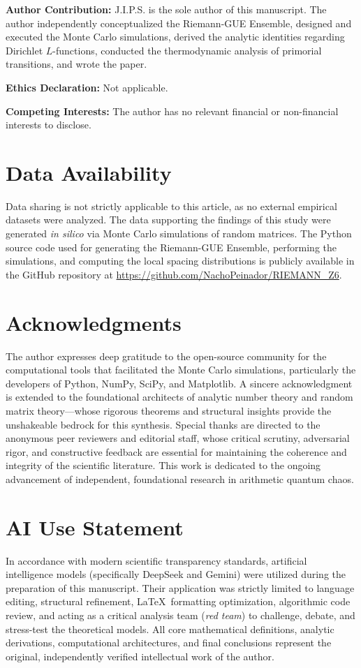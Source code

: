 \documentclass[12pt,a4paper]{article}
\theoremstyle{plain}
\theoremstyle{definition}
\theoremstyle{remark}
\begin{document}
\vspace{0.5em}
\noindent\textbf{Author Contribution:} J.I.P.S. is the sole author of this manuscript. The author independently conceptualized the Riemann-GUE Ensemble, designed and executed the Monte Carlo simulations, derived the analytic identities regarding Dirichlet $L$-functions, conducted the thermodynamic analysis of primorial transitions, and wrote the paper.

\vspace{0.5em}
\noindent\textbf{Ethics Declaration:} Not applicable.

\vspace{0.5em}
\noindent\textbf{Competing Interests:} The author has no relevant financial or non-financial interests to disclose.

\section*{Data Availability}
Data sharing is not strictly applicable to this article, as no external empirical datasets were analyzed. The data supporting the findings of this study were generated \textit{in silico} via Monte Carlo simulations of random matrices. The Python source code used for generating the Riemann-GUE Ensemble, performing the simulations, and computing the local spacing distributions is publicly available in the GitHub repository at \url{https://github.com/NachoPeinador/RIEMANN_Z6}.

\section*{Acknowledgments}
The author expresses deep gratitude to the open-source community for the computational tools that facilitated the Monte Carlo simulations, particularly the developers of Python, NumPy, SciPy, and Matplotlib. A sincere acknowledgment is extended to the foundational architects of analytic number theory and random matrix theory---whose rigorous theorems and structural insights provide the unshakeable bedrock for this synthesis. Special thanks are directed to the anonymous peer reviewers and editorial staff, whose critical scrutiny, adversarial rigor, and constructive feedback are essential for maintaining the coherence and integrity of the scientific literature. This work is dedicated to the ongoing advancement of independent, foundational research in arithmetic quantum chaos.

\section*{AI Use Statement}
In accordance with modern scientific transparency standards, artificial intelligence models (specifically DeepSeek and Gemini) were utilized during the preparation of this manuscript. Their application was strictly limited to language editing, structural refinement, \LaTeX\ formatting optimization, algorithmic code review, and acting as a critical analysis team (\textit{red team}) to challenge, debate, and stress-test the theoretical models. All core mathematical definitions, analytic derivations, computational architectures, and final conclusions represent the original, independently verified intellectual work of the author.
\end{document}
